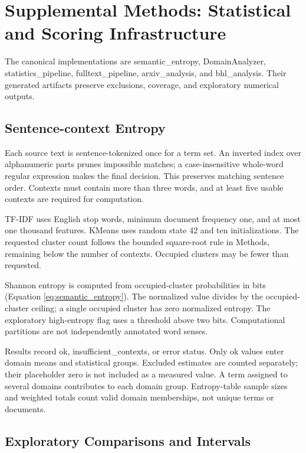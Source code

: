 \documentclass[
]{article}
\numberwithin{equation}{section}
\begin{document}
\section{Supplemental Methods: Statistical and Scoring
Infrastructure}\label{sec:supplemental_infrastructure}

The canonical implementations are semantic\_entropy, DomainAnalyzer,
statistics\_pipeline, fulltext\_pipeline, arxiv\_analysis, and
bhl\_analysis. Their generated artifacts preserve exclusions, coverage,
and exploratory numerical outputs.

\subsection{Sentence-context Entropy}\label{sentence-context-entropy}

Each source text is sentence-tokenized once for a term set. An inverted
index over alphanumeric parts prunes impossible matches; a
case-insensitive whole-word regular expression makes the final decision.
This preserves matching sentence order. Contexts must contain more than
three words, and at least five usable contexts are required for
computation.

TF-IDF uses English stop words, minimum document frequency one, and at
most one thousand features. KMeans uses random state 42 and ten
initializations. The requested cluster count follows the bounded
square-root rule in Methods, remaining below the number of contexts.
Occupied clusters may be fewer than requested.

Shannon entropy is computed from occupied-cluster probabilities in bits
(Equation \ref{eq:semantic_entropy}). The normalized value divides by
the occupied-cluster ceiling; a single occupied cluster has zero
normalized entropy. The exploratory high-entropy flag uses a threshold
above two bits. Computational partitions are not independently annotated
word senses.

Results record ok, insufficient\_contexts, or error status. Only ok
values enter domain means and statistical groups. Excluded estimates are
counted separately; their placeholder zero is not included as a measured
value. A term assigned to several domains contributes to each domain
group. Entropy-table sample sizes and weighted totals count valid domain
memberships, not unique terms or documents.

\subsection{Exploratory Comparisons and
Intervals}\label{exploratory-comparisons-and-intervals}
\end{document}
